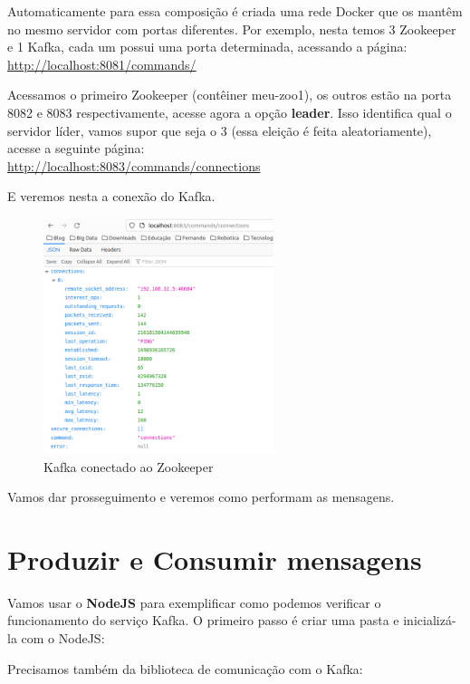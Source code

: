 \documentclass[a4paper,11pt]{article}
\begin{document}
Automaticamente para essa composição é criada uma rede Docker que os mantêm no mesmo servidor com portas diferentes. Por exemplo, nesta temos 3 Zookeeper e 1 Kafka, cada um possui uma porta determinada, acessando a página: \\
\url{http://localhost:8081/commands/}

Acessamos o primeiro Zookeeper (contêiner meu-zoo1), os outros estão na porta 8082 e 8083 respectivamente, acesse agora a opção \textbf{leader}. Isso identifica qual o servidor líder, vamos supor que seja o 3 (essa eleição é feita aleatoriamente), acesse a seguinte página: \\
\url{http://localhost:8083/commands/connections}

E veremos nesta a conexão do Kafka.
\begin{figure}[H]
	\centering
	\includegraphics[width=0.6\textwidth]{imagem/conexaozoo}
	\caption{Kafka conectado ao Zookeeper}
\end{figure}

Vamos dar prosseguimento e veremos como performam as mensagens.

\section{Produzir e Consumir mensagens}
Vamos usar o \textbf{NodeJS} para exemplificar como podemos verificar o funcionamento do serviço Kafka. O primeiro passo é criar uma pasta e inicializá-la com o NodeJS: \\

Precisamos também da biblioteca de comunicação com o Kafka: \\
\end{document}
